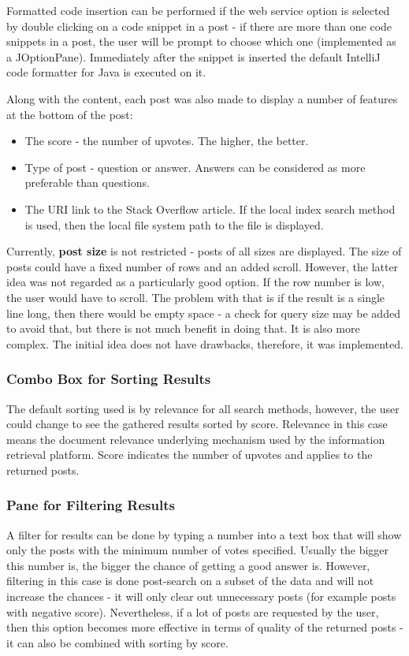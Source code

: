 \documentclass{l4proj}
\begin{document}
\noindent
Formatted code insertion can be performed if the web service option is selected by double clicking on a code snippet in a post - if there are more than one code snippets in a post, the user will be prompt to choose which one (implemented as a JOptionPane). Immediately after the snippet is inserted the default IntelliJ code formatter for Java is executed on it.

Along with the content, each post was also made to display a number of features at the bottom of the post:
\begin{itemize}
\item The score - the number of upvotes. The higher, the better.
\item Type of post - question or answer. Answers can be considered as more preferable than questions.
\item The URI link to the Stack Overflow article. If the local index search method is used, then the  local file system path to the file is displayed.
\end{itemize}

\noindent
Currently, \textbf{post size} is not restricted - posts of all sizes are displayed. The size of posts could have a fixed number of rows and an added scroll. However, the latter idea was not regarded as a particularly good option. If the row number is low, the user would have to scroll. The problem with that is if the result is a single line long, then there would be empty space - a check for query size may be added to avoid that, but there is not much benefit in doing that. It is also more complex. The initial idea does not have drawbacks, therefore, it was implemented.

\subsubsection{Combo Box for Sorting Results}
The default sorting used is by relevance for all search methods, however, the user could change to see the gathered results sorted by score. Relevance in this case means the document relevance underlying mechanism used by the information retrieval platform. Score indicates the number of upvotes and applies to the returned posts. 

\subsubsection{Pane for Filtering Results}
A filter for results can be done by typing a number into a text box that will show only the posts with the minimum number of votes specified. Usually the bigger this number is, the bigger the chance of getting a good answer is. However, filtering in this case is done post-search on a subset of the data and will not increase the chances - it will only clear out unnecessary posts (for example posts with negative score). Nevertheless, if a lot of posts are requested by the user, then this option becomes more effective in terms of quality of the returned posts - it can also be combined with sorting by score.
\end{document}
